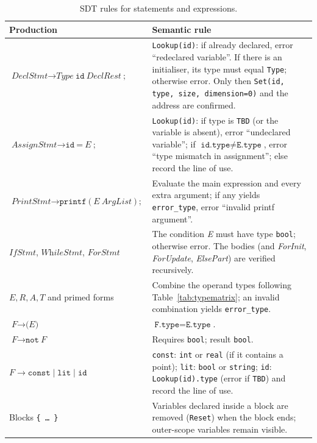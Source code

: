 \documentclass[11pt,a4paper]{article}
\newcommand{\nt}[1]{\textit{#1}}
\newcommand{\tk}[1]{\texttt{#1}}
\begin{document}
\begin{table}[H]
\centering
\footnotesize
\begin{tabularx}{\textwidth}{@{}>{\raggedright\arraybackslash}p{3.6cm}X@{}}
\toprule
\textbf{Production} & \textbf{Semantic rule}\\
\midrule
$\nt{DeclStmt}\to\nt{Type}\ \tk{id}\ \nt{DeclRest}\ \tk{;}$ & \texttt{Lookup(id)}: if already declared, error ``redeclared variable''. If there is an initialiser, its type must equal \texttt{Type}; otherwise error. Only then \texttt{Set(id, type, size, dimension=0)} and the address are confirmed.\\
$\nt{AssignStmt}\to\tk{id}\ \tk{=}\ \nt{E}\ \tk{;}$ & \texttt{Lookup(id)}: if type is \texttt{TBD} (or the variable is absent), error ``undeclared variable''; if $\texttt{id.type}\neq\texttt{E.type}$, error ``type mismatch in assignment''; else record the line of use.\\
$\nt{PrintStmt}\to\tk{printf}\ \tk{(}\ \nt{E}\ \nt{ArgList}\ \tk{)}\ \tk{;}$ & Evaluate the main expression and every extra argument; if any yields \texttt{error\_type}, error ``invalid printf argument''.\\
$\nt{IfStmt}$, $\nt{WhileStmt}$, $\nt{ForStmt}$ & The condition \nt{E} must have type \texttt{bool}; otherwise error. The bodies (and \nt{ForInit}, \nt{ForUpdate}, \nt{ElsePart}) are verified recursively.\\
$\nt{E},\nt{R},\nt{A},\nt{T}$ and primed forms & Combine the operand types following Table~\ref{tab:typematrix}; an invalid combination yields \texttt{error\_type}.\\
$\nt{F}\to\tk{(}\nt{E}\tk{)}$ & $\texttt{F.type}=\texttt{E.type}$.\\
$\nt{F}\to\tk{not}\ \nt{F}$ & Requires \texttt{bool}; result \texttt{bool}.\\
$\nt{F}\to\tk{const}\mid\tk{lit}\mid\tk{id}$ & \texttt{const}: \texttt{int} or \texttt{real} (if it contains a point); \texttt{lit}: \texttt{bool} or \texttt{string}; \texttt{id}: \texttt{Lookup(id).type} (error if \texttt{TBD}) and record the line of use.\\
Blocks \tk{\{ \dots\ \}} & Variables declared inside a block are removed (\texttt{Reset}) when the block ends; outer-scope variables remain visible.\\
\bottomrule
\end{tabularx}
\caption{SDT rules for statements and expressions.}
\label{tab:sdtrules}
\end{table}
\end{document}
